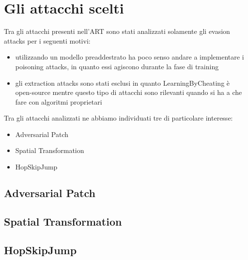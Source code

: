 \section{Gli attacchi scelti}
Tra gli attacchi presenti nell'ART sono stati analizzati solamente gli evasion attacks per i seguenti motivi:\begin{itemize}
    \item utilizzando un modello preaddestrato ha poco senso andare a implementare i poisoning attacks, in quanto essi agiscono durante la fase di training
    \item gli extraction attacks sono stati esclusi in quanto LearningByCheating è open-source mentre questo tipo di attacchi sono rilevanti quando si ha a che fare
    con algoritmi proprietari
\end{itemize}
Tra gli attacchi analizzati ne abbiamo individuati tre di particolare interesse:\begin{itemize}
    \item Adversarial Patch
    \item Spatial Transformation
    \item HopSkipJump
\end{itemize}
\subsection{Adversarial Patch} 

\subsection{Spatial Transformation}

\subsection{HopSkipJump}